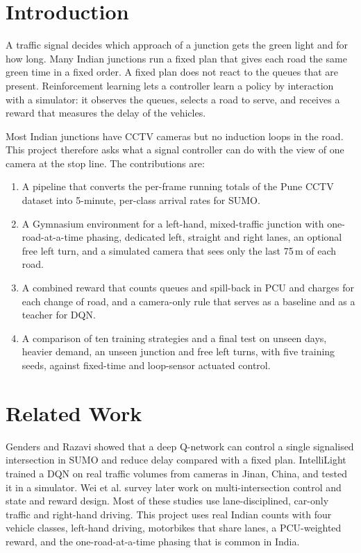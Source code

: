 \documentclass[12pt,a4paper]{article}
\begin{document}
\clearpage
\section{Introduction}
A traffic signal decides which approach of a junction gets the green light and for how long.
Many Indian junctions run a fixed plan that gives each road the same green time in a fixed order.
A fixed plan does not react to the queues that are present. Reinforcement learning lets a controller
learn a policy by interaction with a simulator: it observes the queues, selects a road to serve, and
receives a reward that measures the delay of the vehicles.

Most Indian junctions have CCTV cameras but no induction loops in the road. This project
therefore asks what a signal controller can do with the view of one camera at the stop line.
The contributions are:
\begin{enumerate}
  \item A pipeline that converts the per-frame running totals of the Pune CCTV dataset into
        5-minute, per-class arrival rates for SUMO.
  \item A Gymnasium environment for a left-hand, mixed-traffic junction with one-road-at-a-time
        phasing, dedicated left, straight and right lanes, an optional free left turn, and a
        simulated camera that sees only the last 75\,m of each road.
  \item A combined reward that counts queues and spill-back in PCU and charges for each change of
        road, and a camera-only rule that serves as a baseline and as a teacher for DQN.
  \item A comparison of ten training strategies and a final test on unseen days, heavier demand, an
        unseen junction and free left turns, with five training seeds, against fixed-time and
        loop-sensor actuated control.
\end{enumerate}

\section{Related Work}
Genders and Razavi showed that a deep Q-network can control a single signalised
intersection in SUMO and reduce delay compared with a fixed plan. IntelliLight
trained a DQN on real traffic volumes from cameras in Jinan, China, and tested it in a simulator.
Wei et al. survey later work on multi-intersection control and state and reward
design. Most of these studies use lane-disciplined, car-only traffic and right-hand driving.
This project uses real Indian counts with four vehicle classes, left-hand driving, motorbikes that
share lanes, a PCU-weighted reward, and the one-road-at-a-time phasing that is common in India.
\end{document}
